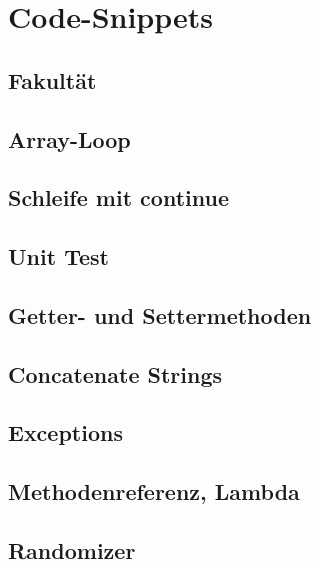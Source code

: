 \section{Code-Snippets}

\subsection{Fakultät}
    

\subsection{Array-Loop}{\label{Array-Loop}}
    

\subsection{Schleife mit continue}
    

\subsection{Unit Test}{\label{Unit-Test}}
    

\subsection{Getter- und Settermethoden}{\label{GetSet}}
    

\subsection{Concatenate Strings}
    

\subsection{Exceptions}
    

\subsection{Methodenreferenz, Lambda}\label{Lambdas}
    

\subsection{Randomizer}
    
